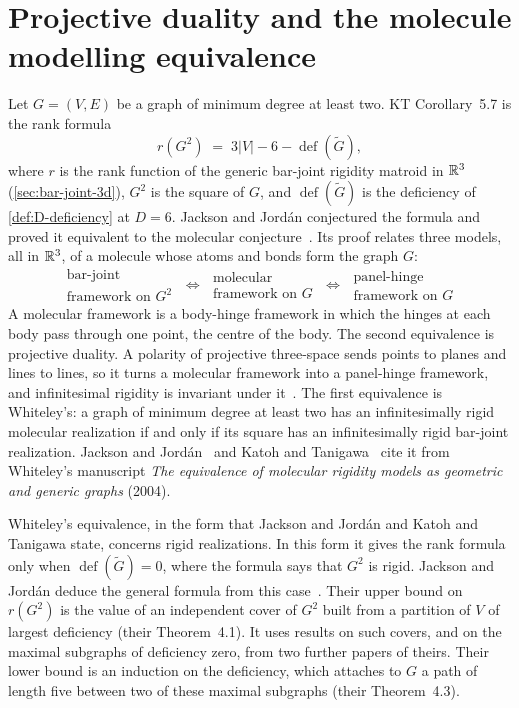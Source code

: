 \section{Projective duality and the molecule modelling equivalence}
\label{sec:molecule-modelling}

Let $G = (V, E)$ be a graph of minimum degree at least two. KT
Corollary~5.7 is the rank formula
\[
  r(G^2) \;=\; 3|V| - 6 - \operatorname{def}(\tilde G),
\]
where $r$ is the rank function of the generic bar-joint rigidity matroid
in ${\mathbb{R}}^3$ (\cref{sec:bar-joint-3d}), $G^2$ is the square of $G$, and
$\operatorname{def}(\tilde G)$ is the deficiency of \cref{def:D-deficiency}
at $D = 6$. Jackson and Jord\'an conjectured the formula and proved it
equivalent to the molecular conjecture~\cite[Conjecture~2.2 and
Theorem~4.3]{jacksonJordan2008}. Its proof relates three models, all in
${\mathbb{R}}^3$, of a molecule whose atoms and bonds form the graph $G$:
\[
  \begin{array}{c} \text{bar-joint} \\ \text{framework on } G^2 \end{array}
  \;\Longleftrightarrow\;
  \begin{array}{c} \text{molecular} \\ \text{framework on } G \end{array}
  \;\Longleftrightarrow\;
  \begin{array}{c} \text{panel-hinge} \\ \text{framework on } G \end{array}
\]
A molecular framework is a body-hinge framework in which the hinges at
each body pass through one point, the centre of the body. The second
equivalence is projective duality. A polarity of projective three-space
sends points to planes and lines to lines, so it turns a molecular
framework into a panel-hinge framework, and infinitesimal rigidity is
invariant under it~\cite[\S3.6]{crapoWhiteley1982}. The first equivalence
is Whiteley's: a graph of minimum degree at least two has an
infinitesimally rigid molecular realization if and only if its square has
an infinitesimally rigid bar-joint realization. Jackson and
Jord\'an~\cite[\S2.1]{jacksonJordan2008} and Katoh and
Tanigawa~\cite[pp.~650 and~671]{katohTanigawa2011} cite it from
Whiteley's manuscript \emph{The equivalence of molecular rigidity models
as geometric and generic graphs} (2004).

Whiteley's equivalence, in the form that Jackson and Jord\'an and Katoh
and Tanigawa state, concerns rigid realizations. In this form it gives the
rank formula only when $\operatorname{def}(\tilde G) = 0$, where the
formula says that $G^2$ is rigid. Jackson and Jord\'an deduce the general
formula from this case~\cite[\S\S3--4]{jacksonJordan2008}. Their upper
bound on $r(G^2)$ is the value of an independent cover of $G^2$ built from
a partition of $V$ of largest deficiency (their Theorem~4.1). It uses
results on such covers, and on the maximal subgraphs of deficiency zero,
from two further papers of theirs. Their lower bound is an induction on
the deficiency, which attaches to $G$ a path of length five between two
of these maximal subgraphs (their Theorem~4.3).

